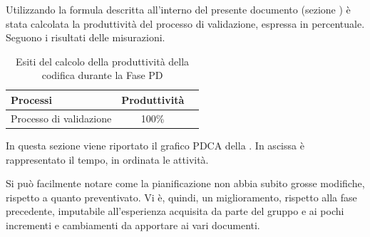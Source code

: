 			Utilizzando la formula descritta all'interno del presente documento (sezione ) è stata calcolata la produttività del processo di validazione, espressa in percentuale. \\
			Seguono i risultati delle misurazioni.
			\\ 
			\begin{table}[H]
				\centering
				\begin{tabu}{| l | c | c |}
					\hline
						Processi 						& Produttività		\\ \hline \hline
						Processo di validazione & 100\%   \\ \hline
				\end{tabu}
				\caption{Esiti del calcolo della produttività della codifica durante la Fase PD}
			\end{table}		
					
		In questa sezione viene riportato il grafico PDCA della . In ascissa è rappresentato il tempo, in ordinata le attività.


		Si può facilmente notare come la pianificazione non abbia subito grosse modifiche, rispetto a quanto preventivato. Vi è, quindi, un miglioramento, rispetto alla fase precedente, imputabile all'esperienza acquisita da parte del gruppo e ai pochi incrementi e cambiamenti da apportare ai vari documenti.